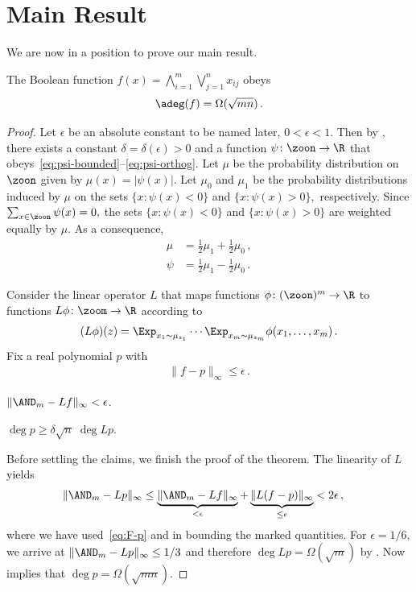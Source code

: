  
\section{Main Result}
 
We are now in a position to prove our main result.

%
%
\begin{theorem}
The Boolean function $f(x)=\bigwedge_{i=1}^m\bigvee_{j=1}^nx_{ij}$
obeys
\begin{align}
\adeg(f)=\Omega(\sqrt{mn})\,.\label{eq:f-adeg-main-equation}
\end{align}
%
\end{theorem}

\begin{proof}
Let $\epsilon$ be an absolute constant to be named later, $0<\epsilon<1$.
Then by , there exists a constant $\delta=\delta(\epsilon)>0$
and a function $\psi\colon\zoon\to\R$ that
obeys~\eqref{eq:psi-bounded}--\eqref{eq:psi-orthog}.
Let $\mu$ be the probability distribution on $\zoon$ given by $\mu(x)=|\psi(x)|$.
Let $\mu_0$ and $\mu_1$ be the probability distributions induced
by $\mu$ on the sets $\{x:\psi(x)<0\}$ and $\{x:\psi(x)>0\},$ respectively.
Since $\sum_{x\in\zoon}\psi(x)=0,$ the sets $\{x:\psi(x)<0\}$ and
$\{x:\psi(x)>0\}$ are weighted equally by $\mu$. As a consequence,
\begin{align}
\mu & =\frac12\mu_1+\frac12\mu_0\,,\label{eq:mu-mu0-mu1}\\
\psi & =\frac12\mu_1-\frac12\mu_0\,.\label{eq:psi-mu0-mu1}
\end{align}
 
 
Consider the linear operator $L$ that maps functions $\phi\colon(\zoon)^m\to\R$
to functions $L\phi\colon\zoom\to\R$ according to
\begin{align*}
(L\phi)(z)=\Exp_{x_1\sim\mu_{z_1}}\cdots\Exp_{x_m\sim\mu_{z_m}}\phi(x_1,\dots,x_m)\,.
\end{align*}
Fix a real polynomial $p$ with
\begin{align}
\|f-p\|_{\infty}\leq\epsilon\,.\label{eq:F-p}
\end{align}
 
\begin{claim} \label{cla:Lf-AND}
\quad $\|\AND_m-Lf\|_{\infty}<\epsilon$.
\end{claim}
 
\begin{claim}
\label{cla:deg}
\quad $\deg p\geq\delta\sqrt{n}\;\deg Lp$.
\end{claim}

Before settling the claims, we finish the proof of the theorem. The
linearity of $L$ yields
\begin{align*}
\|\AND_m-Lp\|_{\infty} & \leq\underbrace{\|\AND_m-Lf\|_{\infty}}_{<\epsilon}
+\underbrace{\|L(f-p)\|_{\infty}}_{\leq\epsilon}<2\epsilon\,,
\end{align*}
where we have used~\eqref{eq:F-p} and  in
bounding the marked quantities. For $\epsilon=1/6,$ we arrive at
$\|\AND_m-Lp\|_{\infty}\leq1/3$ and therefore $\deg Lp=\Omega(\sqrt{m})$
by . Now  implies
that $\deg p=\Omega(\sqrt{mn})$.
\end{proof}
